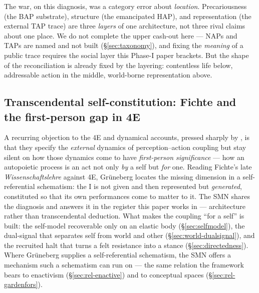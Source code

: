 \documentclass{article}
\begin{document}
The war, on this diagnosis, was a category error about \emph{location}.
Precariousness (the BAP substrate), structure (the emancipated HAP), and
representation (the external TAP trace) are three \emph{layers} of one
architecture, not three rival claims about one place.  We do not complete the
upper cash-out here --- NAPs and TAPs are named and not built
(\S\ref{sec:taxonomy}), and fixing the \emph{meaning} of a public trace requires
the social layer this Phase-I paper brackets.  But the shape of the
reconciliation is already fixed by the layering: contentless life below,
addressable action in the middle, world-borne representation above.

\subsection{Transcendental self-constitution: Fichte and the first-person
gap in 4E}\label{sec:rel-fichte}

A recurring objection to the 4E and dynamical accounts, pressed sharply by
\citet{Gruneberg2026GeneratingI}, is that they specify the \emph{external}
dynamics of perception--action coupling but stay silent on how those
dynamics come to have \emph{first-person significance} --- how an
autopoietic process is an act not only \emph{by} a self but \emph{for}
one.  Reading Fichte's late \emph{Wissenschaftslehre} against 4E,
Gr\"uneberg locates the missing dimension in a self-referential
schematism: the I is not given and then represented but \emph{generated},
constituted so that its own performances come to matter to it.  The SMN
shares the diagnosis and answers it in the register this paper works in
--- architecture rather than transcendental deduction.  What makes the
coupling ``for a self'' is built: the self-model recoverable only on an
elastic body (\S\ref{sec:selfmodel}), the dual-signal that separates self
from world and other (\S\ref{sec:world-dualsignal}), and the recruited
halt that turns a felt resistance into a stance (\S\ref{sec:directedness}).
Where Gr\"uneberg supplies a self-referential schematism, the SMN offers a
mechanism such a schematism can run on --- the same relation the framework
bears to enactivism (\S\ref{sec:rel-enactive}) and to conceptual spaces
(\S\ref{sec:rel-gardenfors}).
\end{document}
